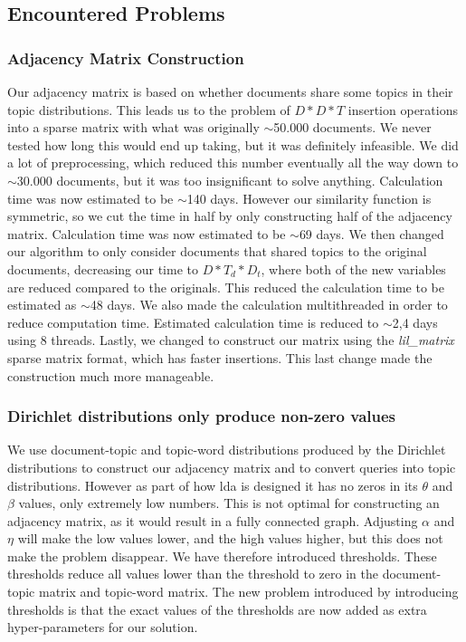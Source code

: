 \subsection{Encountered Problems}

\subsubsection{Adjacency Matrix Construction}\label{app:adj_matrix}
Our adjacency matrix is based on whether documents share some topics in their topic distributions. 
This leads us to the problem of $D*D*T$ insertion operations into a sparse matrix with what was originally $\sim$50.000 documents.
We never tested how long this would end up taking, but it was definitely infeasible.
We did a lot of preprocessing, which reduced this number eventually all the way down to $\sim$30.000 documents, but it was too insignificant to solve anything.
Calculation time was now estimated to be $\sim$140 days.
However our similarity function is symmetric, so we cut the time in half by only constructing half of the adjacency matrix.
Calculation time was now estimated to be $\sim$69 days.
We then changed our algorithm to only consider documents that shared topics to the original documents, decreasing our time to $D*T_d*D_t$, where both of the new variables are reduced compared to the originals.
This reduced the calculation time to be estimated as $\sim$48 days.
We also made the calculation multithreaded in order to reduce computation time.
Estimated calculation time is reduced to $\sim$2,4 days using 8 threads.
Lastly, we changed to construct our matrix using the \emph{lil\_matrix} sparse matrix format, which has faster insertions.
This last change made the construction much more manageable.



\subsubsection{Dirichlet distributions only produce non-zero values}
We use document-topic and topic-word distributions produced by the Dirichlet distributions to construct our adjacency matrix and to convert queries into topic distributions. 
However as part of how \gls{lda} is designed it has no zeros in its $\theta$ and $\beta$ values, only extremely low numbers.
This is not optimal for constructing an adjacency matrix, as it would result in a fully connected graph.
Adjusting $\alpha$ and $\eta$ will make the low values lower, and the high values higher, but this does not make the problem disappear.
We have therefore introduced thresholds.
These thresholds reduce all values lower than the threshold to zero in the document-topic matrix and topic-word matrix.
The new problem introduced by introducing thresholds is that the exact values of the thresholds are now added as extra hyper-parameters for our solution.

